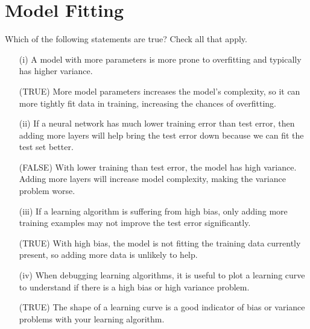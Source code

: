 \documentclass[]{article}
\begin{document}
\section*{Model Fitting}
Which of the following statements are true? Check all that apply.
\begin{itemize}
\item[(i)] A model with more parameters is more prone to overfitting and typically has higher variance.	

(TRUE) More model parameters increases the model's complexity, so it can more tightly fit data in training, increasing the chances of overfitting.
\item[(ii)] If a neural network has much lower training error than test error, then adding more layers will help bring the test error down because we can fit the test set better.	

(FALSE) With lower training than test error, the model has high variance. Adding more layers will increase model complexity, making the variance problem worse.
\item[(iii)] If a learning algorithm is suffering from high bias, only adding more training examples may not improve the test error significantly.

(TRUE) With high bias, the model is not fitting the training data currently present, so adding more data is unlikely to help.
\item[(iv)] When debugging learning algorithms, it is useful to plot a learning curve to understand if there is a high bias or high variance problem.

(TRUE) The shape of a learning curve is a good indicator of bias or variance problems with your learning algorithm.
\end{itemize}
\end{document}
